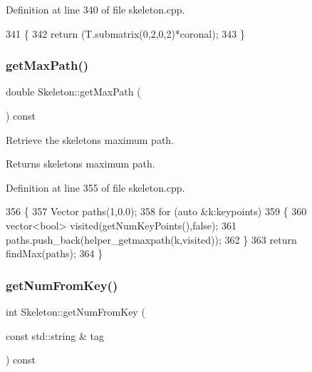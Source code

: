 Definition at line 340 of file skeleton.\+cpp.


\begin{DoxyCode}
341 \{
342     \textcolor{keywordflow}{return} (T.submatrix(0,2,0,2)*coronal);
343 \}
\end{DoxyCode}
\mbox{\label{classassistive__rehab_1_1Skeleton_acda9030cd2ed3ad92697418a5e2cff7c}} 
\subsubsection{\texorpdfstring{get\+Max\+Path()}{getMaxPath()}}
{\footnotesize\ttfamily double Skeleton\+::get\+Max\+Path (\begin{DoxyParamCaption}{ }\end{DoxyParamCaption}) const}



Retrieve the skeleton\textquotesingle{}s maximum path. 

\begin{DoxyReturn}{Returns}
skeleton\textquotesingle{}s maximum path. 
\end{DoxyReturn}


Definition at line 355 of file skeleton.\+cpp.


\begin{DoxyCode}
356 \{
357     Vector paths(1,0.0);
358     \textcolor{keywordflow}{for} (\textcolor{keyword}{auto} &k:keypoints)
359     \{
360         vector<bool> visited(getNumKeyPoints(),\textcolor{keyword}{false});
361         paths.push\_back(helper\_getmaxpath(k,visited));
362     \}
363     \textcolor{keywordflow}{return} findMax(paths);
364 \}
\end{DoxyCode}
\mbox{\label{classassistive__rehab_1_1Skeleton_a954bfa99e0dad997ca6d93495246d3f1}} 
\subsubsection{\texorpdfstring{get\+Num\+From\+Key()}{getNumFromKey()}}
{\footnotesize\ttfamily int Skeleton\+::get\+Num\+From\+Key (\begin{DoxyParamCaption}\item[{const std\+::string \&}]{tag }\end{DoxyParamCaption}) const}



